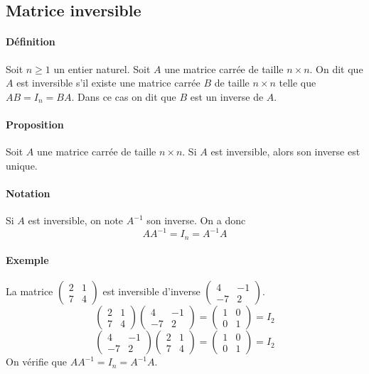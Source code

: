 %
\subsection{Matrice inversible}
%
\paragraph{Définition} Soit $n \geq 1$ un entier naturel. Soit $A$ une matrice carrée de taille $n \times n$. On dit que $A$ est inversible s'il existe une matrice carrée $B$ de taille $n \times n$ telle que $A B = I_n = B A$. Dans ce cas on dit que $B$ est un inverse de $A$.

\paragraph{Proposition} Soit $A$ une matrice carrée de taille $n \times n$. Si $A$ est inversible, alors son inverse est unique.


\paragraph{Notation} Si $A$ est inversible, on note $A^{-1}$ son inverse. On a donc
$$A A^{-1} = I_n = A^{-1} A$$

\paragraph{Exemple} La matrice $\begin{pmatrix} 2 & 1 \\ 7 & 4 \end{pmatrix}$ est inversible d'inverse $\begin{pmatrix} 4 & -1 \\ -7 & 2 \end{pmatrix}$.
$$\begin{pmatrix}2 & 1 \\ 7 & 4 \end{pmatrix} 
  \begin{pmatrix} 4 & -1 \\ -7 & 2 \end{pmatrix} 
  = \begin{pmatrix} 1 & 0 \\ 0 & 1 \end{pmatrix} = I_2$$
$$\begin{pmatrix} 4 & -1 \\ -7 & 2 \end{pmatrix} 
  \begin{pmatrix}2 & 1 \\ 7 & 4 \end{pmatrix}  
  = \begin{pmatrix} 1 & 0 \\ 0 & 1 \end{pmatrix} = I_2$$
On vérifie que $A A^{-1} = I_n = A^{-1} A$.

